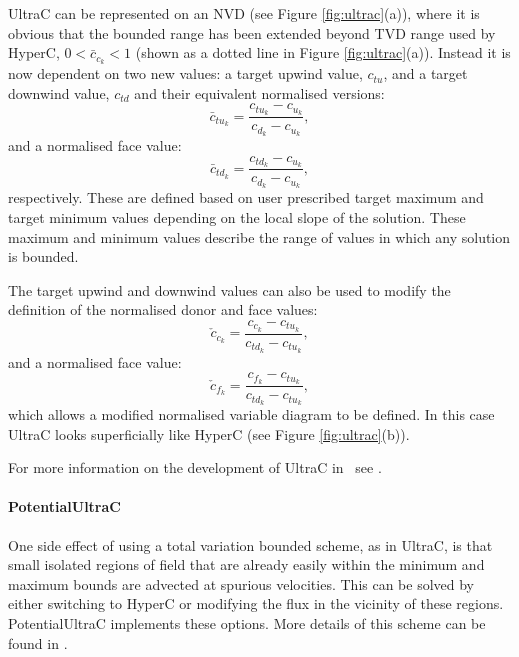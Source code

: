 UltraC can be represented on an NVD (see Figure \ref{fig:ultrac}(a)), where it is obvious that the bounded range has been extended beyond TVD range used by HyperC, $0<\bar{c}_{c_k}<1$ (shown as a dotted line in Figure \ref{fig:ultrac}(a)).  Instead it is now dependent on two new values: a target upwind value, $c_{tu}$, and a target downwind value, $c_{td}$ and their equivalent normalised versions:
\begin{equation}
\bar{c}_{tu_k} = \frac{c_{tu_k}-c_{u_k}}{c_{d_k}-c_{u_k}},
\end{equation}
and a normalised face value:
\begin{equation}
\bar{c}_{td_k} = \frac{c_{td_k}-c_{u_k}}{c_{d_k}-c_{u_k}},
\end{equation}
respectively.  These are defined based on user prescribed target maximum and target minimum values depending on the local slope of the solution.  These maximum and minimum values describe the range of values in which any solution is bounded.

The target upwind and downwind values can also be used to modify the definition of the normalised donor and face values:
\begin{equation}
\check{c}_{c_k} = \frac{c_{c_k}-c_{tu_k}}{c_{td_k}-c_{tu_k}},
\end{equation}
and a normalised face value:
\begin{equation}
\check{c}_{f_k} = \frac{c_{f_k}-c_{tu_k}}{c_{td_k}-c_{tu_k}},
\end{equation}
which allows a modified normalised variable diagram to be defined.  In this case UltraC looks superficially like HyperC (see Figure \ref{fig:ultrac}(b)).

For more information on the development of UltraC in \fluidity\ see \citet{wilson_phdthesis_2009}.

\paragraph{PotentialUltraC} \label{sec:potultrac}

One side effect of using a total variation bounded scheme, as in UltraC, is that small isolated regions of field that are already easily within the minimum and maximum bounds are advected at spurious velocities.  This can be solved by either switching to HyperC or modifying the flux in the vicinity of these regions.  PotentialUltraC implements these options.  More details of this scheme can be found in \citet{wilson_phdthesis_2009}.

